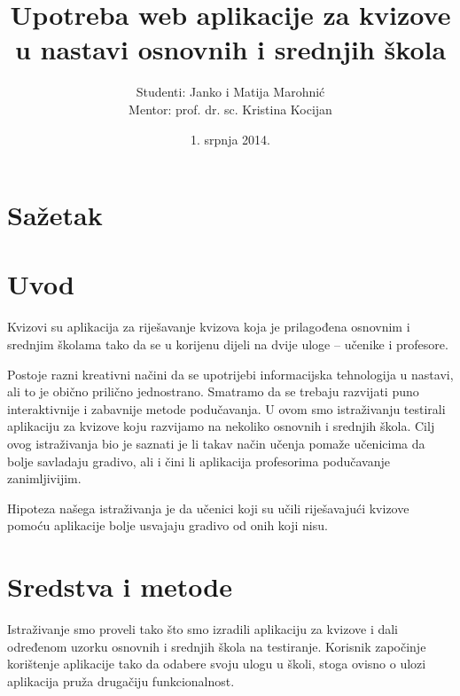 \documentclass{scrreprt}
\begin{document}
\titlehead{Sveučilište u Zagrebu\\Filozofski fakultet\\Odsijek za informacijske
i komunikacijske znanosti\\Akademska godina 2013/14.}
\title{Upotreba web aplikacije za kvizove u nastavi osnovnih i srednjih škola}
\author{Studenti: Janko i Matija Marohnić\\Mentor: prof. dr. sc. Kristina
Kocijan}
\date{1. srpnja 2014.}

\maketitle
\tableofcontents

\chapter{Sažetak}

\chapter{Uvod}

Kvizovi su aplikacija za riješavanje kvizova koja je prilagođena osnovnim i
srednjim školama tako da se u korijenu dijeli na dvije uloge -- učenike i
profesore.

Postoje razni kreativni načini da se upotrijebi informacijska tehnologija u
nastavi, ali to je obično prilično jednostrano. Smatramo da se trebaju razvijati
puno interaktivnije i zabavnije metode podučavanja. U ovom smo istraživanju
testirali aplikaciju za kvizove koju razvijamo na nekoliko osnovnih i srednjih
škola. Cilj ovog istraživanja bio je saznati je li takav način učenja pomaže
učenicima da bolje savladaju gradivo, ali i čini li aplikacija profesorima
podučavanje zanimljivijim.

Hipoteza našega istraživanja je da učenici koji su učili riješavajući kvizove
pomoću aplikacije bolje usvajaju gradivo od onih koji nisu.

\chapter{Sredstva i metode}

Istraživanje smo proveli tako što smo izradili aplikaciju za kvizove i dali
određenom uzorku osnovnih i srednjih škola na testiranje. Korisnik započinje
korištenje aplikacije tako da odabere svoju ulogu u školi, stoga ovisno o ulozi
aplikacija pruža drugačiju funkcionalnost.
\end{document}
